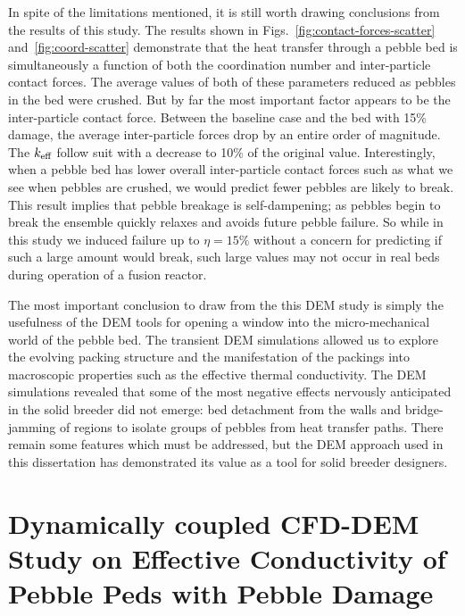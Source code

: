In spite of the limitations mentioned, it is still worth drawing conclusions from the results of this study. The results shown in Figs.~\ref{fig:contact-forces-scatter} and~\ref{fig:coord-scatter} demonstrate that the heat transfer through a pebble bed is simultaneously a function of both the coordination number and inter-particle contact forces. The average values of both of these parameters reduced as pebbles in the bed were crushed. But by far the most important factor appears to be the inter-particle contact force. Between the baseline case and the bed with 15\% damage, the average inter-particle forces drop by an entire order of magnitude. The $k_\text{eff}$ follow suit with a decrease to 10\% of the original value. Interestingly, when a pebble bed has lower overall inter-particle contact forces such as what we see when pebbles are crushed, we would predict fewer pebbles are likely to break. This result implies that pebble breakage is self-dampening; as pebbles begin to break the ensemble quickly relaxes and avoids future pebble failure. So while in this study we induced failure up to $\eta = 15\%$ without a concern for predicting if such a large amount would break, such large values may not occur in real beds during operation of a fusion reactor. 

The most important conclusion to draw from the this DEM study is simply the usefulness of the DEM tools for opening a window into the micro-mechanical world of the pebble bed. The transient DEM simulations allowed us to explore the evolving packing structure and the manifestation of the packings into macroscopic properties such as the effective thermal conductivity. The DEM simulations revealed that some of the most negative effects nervously anticipated in the solid breeder did not emerge: bed detachment from the walls and bridge-jamming of regions to isolate groups of pebbles from heat transfer paths. There remain some features which must be addressed, but the DEM approach used in this dissertation has demonstrated its value as a tool for solid breeder designers. 












\section{Dynamically coupled CFD-DEM Study on Effective Conductivity of Pebble Peds with Pebble Damage}\label{sec:cfd-dem-studies}

